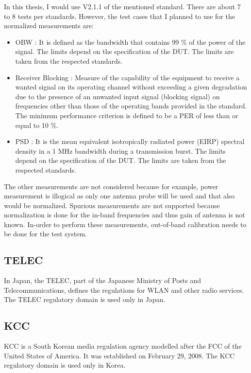In this thesis, I would use V2.1.1 of the mentioned standard. There are about 7 to 8 tests per standards. However, the test cases that I planned to use for the normalized measurements are:
\begin{itemize}
\item \acf{OBW} \cite{etsi300328}: It is defined as the bandwidth that contains 99 \% of the power of the signal. The limits depend on the specification of the \acs{DUT}. The limits are taken from the respected standards.
\item Receiver Blocking \cite{etsi300328}:  Measure of the capability of the equipment to receive a wanted signal on its operating channel without exceeding a given degradation due to the presence of an unwanted input signal (blocking signal) on frequencies other than those of the operating bands provided in the standard. The minimum performance criterion is defined to be a \acf{PER} of less than or equal to 10 \%.
\item \acf{PSD} \cite{etsi300328}: It is the mean equivalent isotropically radiated power (\acs{EIRP}) spectral density in a 1 MHz bandwidth during a transmission burst. The limits depend on the specification of the \acs{DUT}. The limits are taken from the respected standards.
\end{itemize}
The other measurements are not considered because for example, power measurement is illogical as only one antenna probe will be used and that also would be normalized. Spurious measurements are not supported because normalization is done for the in-band frequencies and thus gain of antenna is not known. In-order to perform these measurements, out-of-band calibration needs to be done for the test system. 


\subsection{\acf{TELEC}}
In Japan, the \acf{TELEC}, part of the Japanese Ministry of Posts and Telecommunications, defines the regulations for \acs{WLAN} and other radio services. The \acs{TELEC} regulatory domain is used only in Japan.


\subsection{\acf{KCC}}
\acs{KCC} is a South Korean media regulation agency modelled after the \acf{FCC} of the United States of America. It was established on February 29, 2008. The \acs{KCC} regulatory domain is used only in Korea.
 


